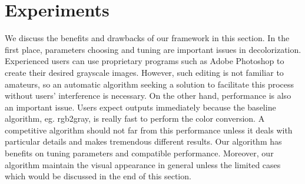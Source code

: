 \section{Experiments}
\label{sec:experiments}

We discuss the benefits and drawbacks of our framework in this section.
In the first place, parameters choosing and tuning are important issues in decolorization.
Experienced users can use proprietary programs such as Adobe Photoshop 
to create their desired grayscale images.
However, such editing is not familiar to amateurs, so an automatic algorithm seeking 
a solution to facilitate this process without users' interference is necessary.
On the other hand, performance is also an important issue. 
Users expect outputs immediately because the baseline algorithm, eg. rgb2gray, 
is really fast to perform the color conversion.
A competitive algorithm should not far from this performance unless it deals with
particular details and makes tremendous different results.
Our algorithm has benefits on tuning parameters and compatible performance.
Moreover, our algorithm maintain the visual appearance in general unless the limited
cases which would be discussed in the end of this section.

